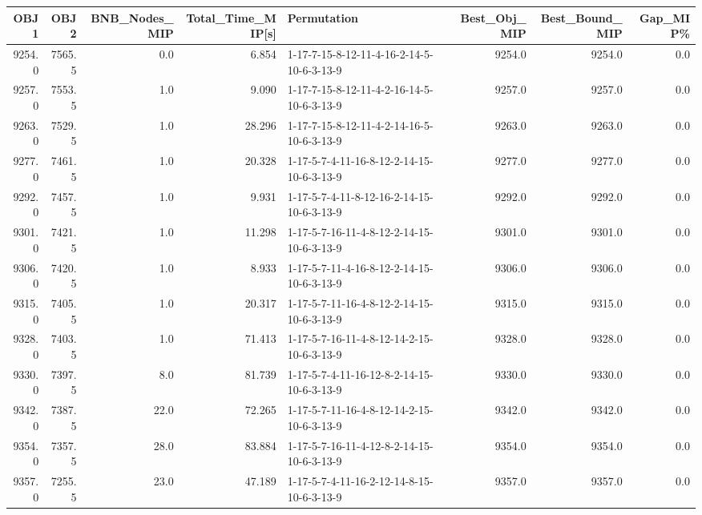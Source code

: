 \begin{tabular}{rrrrlrrr}
\toprule
    OBJ1 &    OBJ2 &  BNB\_Nodes\_MIP &  Total\_Time\_MIP[s] &                                Permutation &  Best\_Obj\_MIP &  Best\_Bound\_MIP &  Gap\_MIP\% \\
\midrule
  9254.0 &  7565.5 &            0.0 &              6.854 &  1-17-7-15-8-12-11-4-16-2-14-5-10-6-3-13-9 &        9254.0 &          9254.0 &       0.0 \\
  9257.0 &  7553.5 &            1.0 &              9.090 &  1-17-7-15-8-12-11-4-2-16-14-5-10-6-3-13-9 &        9257.0 &          9257.0 &       0.0 \\
  9263.0 &  7529.5 &            1.0 &             28.296 &  1-17-7-15-8-12-11-4-2-14-16-5-10-6-3-13-9 &        9263.0 &          9263.0 &       0.0 \\
  9277.0 &  7461.5 &            1.0 &             20.328 &  1-17-5-7-4-11-16-8-12-2-14-15-10-6-3-13-9 &        9277.0 &          9277.0 &       0.0 \\
  9292.0 &  7457.5 &            1.0 &              9.931 &  1-17-5-7-4-11-8-12-16-2-14-15-10-6-3-13-9 &        9292.0 &          9292.0 &       0.0 \\
  9301.0 &  7421.5 &            1.0 &             11.298 &  1-17-5-7-16-11-4-8-12-2-14-15-10-6-3-13-9 &        9301.0 &          9301.0 &       0.0 \\
  9306.0 &  7420.5 &            1.0 &              8.933 &  1-17-5-7-11-4-16-8-12-2-14-15-10-6-3-13-9 &        9306.0 &          9306.0 &       0.0 \\
  9315.0 &  7405.5 &            1.0 &             20.317 &  1-17-5-7-11-16-4-8-12-2-14-15-10-6-3-13-9 &        9315.0 &          9315.0 &       0.0 \\
  9328.0 &  7403.5 &            1.0 &             71.413 &  1-17-5-7-16-11-4-8-12-14-2-15-10-6-3-13-9 &        9328.0 &          9328.0 &       0.0 \\
  9330.0 &  7397.5 &            8.0 &             81.739 &  1-17-5-7-4-11-16-12-8-2-14-15-10-6-3-13-9 &        9330.0 &          9330.0 &       0.0 \\
  9342.0 &  7387.5 &           22.0 &             72.265 &  1-17-5-7-11-16-4-8-12-14-2-15-10-6-3-13-9 &        9342.0 &          9342.0 &       0.0 \\
  9354.0 &  7357.5 &           28.0 &             83.884 &  1-17-5-7-16-11-4-12-8-2-14-15-10-6-3-13-9 &        9354.0 &          9354.0 &       0.0 \\
  9357.0 &  7255.5 &           23.0 &             47.189 &  1-17-5-7-4-11-16-2-12-14-8-15-10-6-3-13-9 &        9357.0 &          9357.0 &       0.0 \\

\end{tabular}
